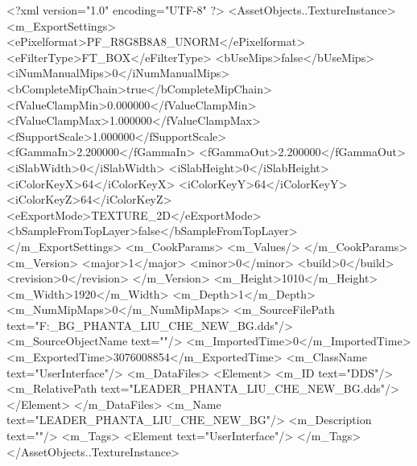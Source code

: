 <?xml version="1.0" encoding="UTF-8" ?>
<AssetObjects..TextureInstance>
	<m_ExportSettings>
		<ePixelformat>PF_R8G8B8A8_UNORM</ePixelformat>
		<eFilterType>FT_BOX</eFilterType>
		<bUseMips>false</bUseMips>
		<iNumManualMips>0</iNumManualMips>
		<bCompleteMipChain>true</bCompleteMipChain>
		<fValueClampMin>0.000000</fValueClampMin>
		<fValueClampMax>1.000000</fValueClampMax>
		<fSupportScale>1.000000</fSupportScale>
		<fGammaIn>2.200000</fGammaIn>
		<fGammaOut>2.200000</fGammaOut>
		<iSlabWidth>0</iSlabWidth>
		<iSlabHeight>0</iSlabHeight>
		<iColorKeyX>64</iColorKeyX>
		<iColorKeyY>64</iColorKeyY>
		<iColorKeyZ>64</iColorKeyZ>
		<eExportMode>TEXTURE_2D</eExportMode>
		<bSampleFromTopLayer>false</bSampleFromTopLayer>
	</m_ExportSettings>
	<m_CookParams>
		<m_Values/>
	</m_CookParams>
	<m_Version>
		<major>1</major>
		<minor>0</minor>
		<build>0</build>
		<revision>0</revision>
	</m_Version>
	<m_Height>1010</m_Height>
	<m_Width>1920</m_Width>
	<m_Depth>1</m_Depth>
	<m_NumMipMaps>0</m_NumMipMaps>
	<m_SourceFilePath text="F:\MOD\TEMPLATE\NEW_BG\LEADER_PHANTA_LIU_CHE_NEW_BG.dds"/>
	<m_SourceObjectName text=""/>
	<m_ImportedTime>0</m_ImportedTime>
	<m_ExportedTime>3076008854</m_ExportedTime>
	<m_ClassName text="UserInterface"/>
	<m_DataFiles>
		<Element>
			<m_ID text="DDS"/>
			<m_RelativePath text="LEADER_PHANTA_LIU_CHE_NEW_BG.dds"/>
		</Element>
	</m_DataFiles>
	<m_Name text="LEADER_PHANTA_LIU_CHE_NEW_BG"/>
	<m_Description text=""/>
	<m_Tags>
		<Element text="UserInterface"/>
	</m_Tags>
</AssetObjects..TextureInstance>

